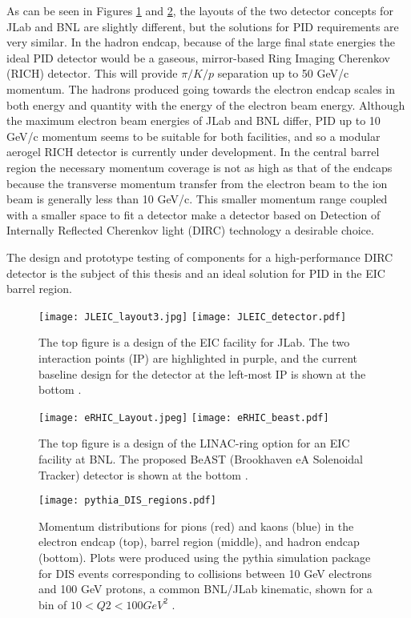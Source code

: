 As can be seen in Figures \ref{fig:jleic_layout} and \ref{fig:erhic_layout}, the layouts of the two detector concepts for JLab and BNL are slightly different, but the solutions for PID requirements are very similar. In the hadron endcap, because of the large final state energies the ideal PID detector would be a gaseous, mirror-based Ring Imaging Cherenkov (RICH) detector. This will provide $\pi/K/p$ separation up to 50 GeV/c momentum. The hadrons produced going towards the electron endcap scales in both energy and quantity with the energy of the electron beam energy. Although the maximum electron beam energies of JLab and BNL differ, PID up to 10 GeV/c momentum seems to be suitable for both facilities, and so a modular aerogel RICH detector is currently under development. In the central barrel region the necessary momentum coverage is not as high as that of the endcaps because the transverse momentum transfer from the electron beam to the ion beam is generally less than 10 GeV/c. This smaller momentum range coupled with a smaller space to fit a detector make a detector based on Detection of Internally Reflected Cherenkov light (DIRC) technology a desirable choice.

The design and prototype testing of components for a high-performance DIRC detector is the subject of this thesis and an ideal solution for PID in the EIC barrel region.


\begin{figure}[!htb]
	\centering
	\texttt{[image: JLEIC\_layout3.jpg]}
	\texttt{[image: JLEIC\_detector.pdf]}
	\caption[The top figure is a design of the EIC facility for JLab.]{The top figure is a design of the EIC facility for JLab. The two interaction points (IP) are highlighted in purple, and the current baseline design for the detector at the left-most IP is shown at the bottom \cite{eRD14}.}
	\label{fig:jleic_layout}
\end{figure}

\begin{figure}[!htb]
	\centering
	\texttt{[image: eRHIC\_Layout.jpeg]}
	\texttt{[image: eRHIC\_beast.pdf]}
	\caption[The top figure is a design of the LINAC-ring option for an EIC facility at BNL.]{The top figure is a design of the LINAC-ring option for an EIC facility at BNL. The proposed BeAST (Brookhaven eA Solenoidal Tracker) detector is shown at the bottom \cite{eRD14}.}
	\label{fig:erhic_layout}
\end{figure}

\begin{figure}[!htb]
	\centering
	\texttt{[image: pythia\_DIS\_regions.pdf]}
	\caption[Momentum distributions for pions (red) and kaons (blue) in the electron endcap (top), barrel region (middle), and hadron endcap (bottom).]{Momentum distributions for pions (red) and kaons (blue) in the electron endcap (top), barrel region (middle), and hadron endcap (bottom). Plots were produced using the pythia simulation package for DIS events corresponding to collisions between 10 GeV electrons and 100 GeV protons, a common BNL/JLab kinematic, shown for a bin of $10<Q2<100\unit{GeV}^2$ \cite{eRD14}.}
	\label{fig:pythia_DIS}
\end{figure}

